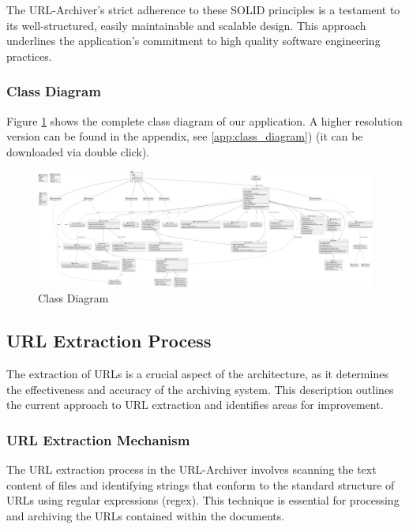 The URL-Archiver's strict adherence to these SOLID principles is a testament to its well-structured, easily maintainable and scalable design. This approach underlines the application's commitment to high quality software engineering practices.
\begin{landscape}
	\thispagestyle{empty}
	\subsubsection{Class Diagram}
	Figure \ref{fig:class_diagram} shows the complete class diagram of our application. A higher resolution version can be found in the appendix, see \ref{app:class_diagram}) (it can be downloaded via double click). 
	\begin{figure}[h!]
		\includegraphics[width=1.9\textwidth]{./diagrams/uml_diagram.pdf}
		\centering
		\caption{Class Diagram}
		\label{fig:class_diagram}
	\end{figure}

\end{landscape}
\restoregeometry

\subsection{URL Extraction Process}

The extraction of URLs is a crucial aspect of the architecture, as it determines the effectiveness and accuracy of the archiving system. This description outlines the current approach to URL extraction and identifies areas for improvement.

\subsubsection{URL Extraction Mechanism}
The URL extraction process in the URL-Archiver involves scanning the text content of files and identifying strings that conform to the standard structure of URLs using regular expressions (regex). This technique is essential for processing and archiving the URLs contained within the documents.

